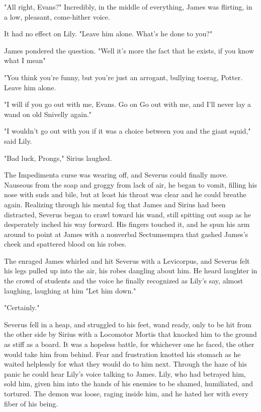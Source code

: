 "All right, Evans?" Incredibly, in the middle of everything, James was flirting, in a low, pleasant, come-hither voice.

It had no effect on Lily. "Leave him alone. What's he done to you?"

James pondered the question. "Well{\el} it's more the fact that he exists, if you know what I mean{\el}"

"You think you're funny, but you're just an arrogant, bullying toerag, Potter. Leave him alone.

"I will if you go out with me, Evans. Go on{\el} Go out with me, and I'll never lay a wand on old Snivelly again."

"I wouldn't go out with you if it was a choice between you and the giant squid," said Lily.

"Bad luck, Prongs," Sirius laughed.

The Impedimenta curse was wearing off, and Severus could finally move. Nauseous from the soap and groggy from lack of air, he began to vomit, filling his nose with suds and bile, but at least his throat was clear and he could breathe again. Realizing through his mental fog that James and Sirius had been distracted, Severus began to crawl toward his wand, still spitting out soap as he desperately inched his way forward. His fingers touched it, and he spun his arm around to point at James with a nonverbal Sectumsempra that gashed James's cheek and spattered blood on his robes.

The enraged James whirled and hit Severus with a Levicorpus, and Severus felt his legs pulled up into the air, his robes dangling about him. He heard laughter in the crowd of students and the voice he finally recognized as Lily's say, almost laughing, laughing at him{\el} "Let him down."

"Certainly."

Severus fell in a heap, and struggled to his feet, wand ready, only to be hit from the other side by Sirius with a Locomotor Mortis that knocked him to the ground as stiff as a board. It was a hopeless battle, for whichever one he faced, the other would take him from behind. Fear and frustration knotted his stomach as he waited helplessly for what they would do to him next. Through the haze of his panic he could hear Lily's voice talking to James. Lily, who had betrayed him, sold him, given him into the hands of his enemies to be shamed, humiliated, and tortured. The demon was loose, raging inside him, and he hated her with every fiber of his being.

